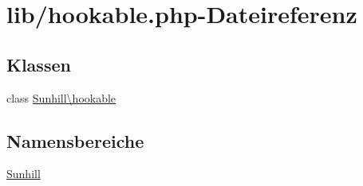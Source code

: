 \hypertarget{hookable_8php}{}\section{lib/hookable.php-\/\+Dateireferenz}
\label{hookable_8php}
\subsection*{Klassen}
\begin{DoxyCompactItemize}
\item 
class \hyperlink{classSunhill_1_1hookable}{Sunhill\textbackslash{}hookable}
\end{DoxyCompactItemize}
\subsection*{Namensbereiche}
\begin{DoxyCompactItemize}
\item 
 \hyperlink{namespaceSunhill}{Sunhill}
\end{DoxyCompactItemize}
